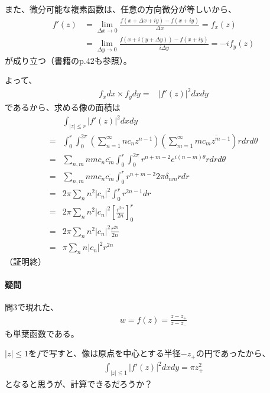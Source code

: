 また、微分可能な複素函数は、任意の方向微分が等しいから、
\begin{align*}
    f'(z)&=\lim_{\Delta x\to0}\frac{f(x+\Delta x+iy)-f(x+iy)}{\Delta x}=f_x(z)\\
    &=\lim_{\Delta y\to0}\frac{f(x+i(y+\Delta y))-f(x+iy)}{i\Delta y}=-if_y(z)
\end{align*}
が成り立つ（書籍のp.42も参照）。

よって、
\begin{align*}
    f_xdx\times f_ydy
    =&|f'(z)|^2dxdy
\end{align*}
であるから、求める像の面積は
\begin{align*}
    &\int_{|z|\le r}|f'(z)|^2dxdy\\
    =&\int_{0}^{r}\int_{0}^{2\pi}\left(\sum_{n=1}^{\infty}nc_nz^{n-1}\right)\left(\sum_{m=1}^{\infty}m\overline{c_mz^{m-1}}\right)rdrd\theta\\
    =&\sum_{n,m}nmc_n\overline{c_m}\int_{0}^{r}
    \int_{0}^{2\pi}r^{n+m-2}e^{i(n-m)\theta}rdrd\theta\\
    =&\sum_{n,m}nmc_n\overline{c_m}\int_{0}^{r}
    r^{n+m-2}2\pi\delta_{nm}rdr\\
    =&2\pi\sum_{n}n^2|c_n|^2\int_{0}^{r}
    r^{2n-1}dr\\
    =&2\pi\sum_{n}n^2|c_n|^2\left[\frac{r^{2n}}{2n}\right]_0^r\\
    =&2\pi\sum_{n}n^2|c_n|^2\frac{r^{2n}}{2n}\\
    =&\pi\sum_{n}n|c_n|^2r^{2n}
\end{align*}
（証明終）

\paragraph{疑問}
問3で現れた、
\begin{align*}
    w=f(z)=\frac{z-z_+}{z-z_-}
\end{align*}
も単葉函数である。

$|z|\le1$を$f$で写すと、像は原点を中心とする半径$-z_+$の円であったから、
\begin{align*}
    \int_{|z|\le 1}|f'(z)|^2dxdy=\pi z_+^2
\end{align*}
となると思うが、計算できるだろうか？